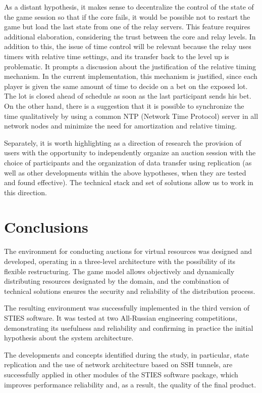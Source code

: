 \documentclass[
]{ceurart}
\begin{document}
As a distant hypothesis, it makes sense to ​​decentralize the control of the state of the game session so that if the core fails, it would be possible not to restart the game but load the last state from one of the relay servers. This feature requires additional elaboration, considering the trust between the core and relay levels. In addition to this, the issue of time control will be relevant because the relay uses timers with relative time settings, and its transfer back to the level up is problematic. It prompts a discussion about the justification of the relative timing mechanism. In the current implementation, this mechanism is justified, since each player is given the same amount of time to decide on a bet on the exposed lot. The lot is closed ahead of schedule as soon as the last participant sends his bet. On the other hand, there is a suggestion that it is possible to synchronize the time qualitatively by using a common NTP (Network Time Protocol) server in all network nodes and minimize the need for amortization and relative timing.

Separately, it is worth highlighting as a direction of research the provision of users with the opportunity to independently organize an auction session with the choice of participants and the organization of data transfer using replication (as well as other developments within the above hypotheses, when they are tested and found effective). The technical stack and set of solutions allow us to work in this direction.


\section*{Conclusions}
\label{sec:conc}

The environment for conducting auctions for virtual resources was designed and developed, operating in a three-level architecture with the possibility of its flexible restructuring. The game model allows objectively and dynamically distributing resources designated by the domain, and the combination of technical solutions ensures the security and reliability of the distribution process.

The resulting environment was successfully implemented in the third version of STIES software. It was tested at two All-Russian engineering competitions, demonstrating its usefulness and reliability and confirming in practice the initial hypothesis about the system architecture.

The developments and concepts identified during the study, in particular, state replication and the use of network architecture based on SSH tunnels, are successfully applied in other modules of the STIES software package, which improves performance reliability and, as a result, the quality of the final product.
\end{document}
